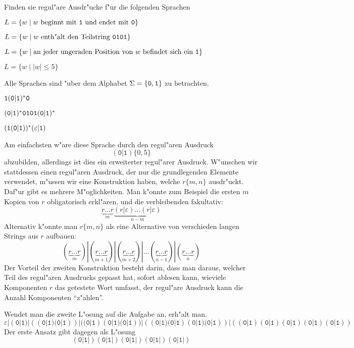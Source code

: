 Finden sie regul"are Ausdr"ucke f"ur die folgenden Sprachen
\begin{teilaufgaben}
\item $L=\{w\;|\;\text{$w$ beginnt mit {\tt 1} und endet mit {\tt 0}}\}$
\item $L=\{w\;|\;\text{$w$ enth"alt den Teilstring {\tt 0101}}\}$
\item $L=\{w\;|\;\text{an jeder ungeraden Position von $w$ befindet sich ein {\tt 1}}\}$
\item $L=\{w\;|\;|w|\le 5\}$
\end{teilaufgaben}
Alle Sprachen sind "uber dem Alphabet $\Sigma=\{{\tt 0},{\tt 1}\}$ zu
betrachten.

\begin{loesung}
\begin{teilaufgaben}
\item ${\tt 1}({\tt 0}|{\tt 1})^*{\tt 0}$
\item $({\tt 0}|{\tt 1})^* {\tt 0101} ({\tt 0}|{\tt 1})^*$
\item $({\tt 1}({\tt 0}|{\tt 1}))^*(\varepsilon|{\tt 1})$
\item
Am einfachsten w"are diese Sprache durch den regul"aren Ausdruck 
\[
(\texttt{0}|\texttt{1})\{0,5\}
\]
abzubilden, allerdings ist dies ein erweiterter regul"arer Ausdruck.
W"unschen wir stattdessen einen regul"aren Ausdruck, der nur die
grundlegenden Elemente verwendet, m"ussen wir eine Konstruktion haben,
welche $r\{m,n\}$ ausdr"uckt. Daf"ur gibt es mehrere M"oglichkeiten.
Man k"onnte zum Beispiel die ersten $m$ Kopien von $r$ obligatorisch
erkl"aren, und die verbleibenden fakultativ:
\[
\underbrace{r\dots r}_m\underbrace{(r|\varepsilon)\dots(r|\varepsilon)}_{n-m}
\]
Alternativ k"onnte man $r\{m,n\}$ als eine Alternative von verschieden langen
Strings aus $r$ aufbauen:
\[
(\underbrace{r\dots r}_m)|
(\underbrace{r\dots r}_{m+1})|
(\underbrace{r\dots r}_{m+2})|\dots
(\underbrace{r\dots r}_{n - 1})|
(\underbrace{r\dots r}_{n})
\]
Der Vorteil der zweiten Konstruktion besteht darin, dass man daraus, welcher
Teil des regul"aren Ausdrucks gepasst hat, sofort ablesen kann, wieviele
Komponenten $r$ das getestete Wort umfasst, der regul"are Ausdruck kann
die Anzahl Komponenten ``z"ahlen''.

Wendet man die zweite L"osung auf die Aufgabe an, erh"alt man.
\[
\varepsilon|
(\texttt{0}|\texttt{1})|
((\texttt{0}|\texttt{1}) (\texttt{0}|\texttt{1}))|
((\texttt{0}|\texttt{1}) (\texttt{0}|\texttt{1}) (\texttt{0}|\texttt{1}))|
((\texttt{0}|\texttt{1}) (\texttt{0}|\texttt{1}) (\texttt{0}|\texttt{1}) (\texttt{0}|\texttt{1}))|
((\texttt{0}|\texttt{1}) (\texttt{0}|\texttt{1}) (\texttt{0}|\texttt{1}) (\texttt{0}|\texttt{1}) (\texttt{0}|\texttt{1}))
\]
Der erste Ansatz gibt dagegen als L"osung
\[
(\texttt{0}|\texttt{1}|)
(\texttt{0}|\texttt{1}|)
(\texttt{0}|\texttt{1}|)
(\texttt{0}|\texttt{1}|)
(\texttt{0}|\texttt{1}|)
\]
\end{teilaufgaben}
\end{loesung}
